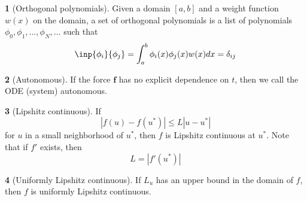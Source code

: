 \documentclass[12pt]{article}
\theoremstyle{definition}
\newtheorem{definition}{\color{NavyBlue}{\textbf{Definition}}}
\begin{document}
\begin{definition}[Orthogonal polynomials]
Given a domain $[a,b]$ and a weight function $w(x)$ on the domain, a set of orthogonal polynomials is a list of polynomials $\phi_0, \phi_1, \ldots, \phi_N, \ldots$ such that
\begin{equation}
\inp{\phi_i}{\phi_j} = \int_a^b \phi_i(x)\phi_j(x)w(x)dx = \delta_{ij}
\end{equation}
\end{definition}

\begin{definition}[Autonomous]
If the force $\bm f$ has no explicit dependence on $t$, then we call the ODE (system) autonomous.
\end{definition}

\begin{definition}[Lipshitz continuous]
If
\begin{equation}
|f(u) - f(u^*)| \leq L|u-u^*|
\end{equation}
for $u$ in a small neighborhood of $u^*$, then $f$ is Lipshitz continuous at $u^*$. Note that if $f'$ exists, then
\begin{equation}
L = |f'(u^*)|
\end{equation}
\end{definition}

\begin{definition}[Uniformly Lipshitz continuous]
If $L_u$ has an upper bound in the domain of $f$, then $f$ is uniformly Lipshitz continuous.
\end{definition}
\end{document}
